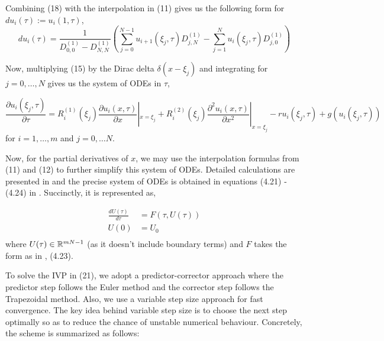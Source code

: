 \documentclass[a4paper,12pt]{article}
\begin{document}
Combining (18) with the interpolation in (11) gives us the following form for $du_i(\tau) := u_i(1, \tau)$,
\begin{equation}
    du_i(\tau) = \frac{1}{D_{0,0}^{(1)} - D_{N,N}^{(1)}} \left( \sum_{j=0}^{N-1} u_{i+1}(\xi_j, \tau)D_{j,N}^{(1)} - \sum_{j=1}^{N} u_{i}(\xi_j, \tau)D_{j,0}^{(1)} \right)
\end{equation}

Now, multiplying (15) by the Dirac delta $\delta(x - \xi_j)$ and integrating for $j = 0, \dots, N$ gives us the system of ODEs in $\tau$,

\begin{equation}
    \frac{\partial u_i(\xi_j, \tau)}{\partial \tau} = R_i^{(1)}(\xi_j)\frac{\partial u_i(x, \tau)}{\partial x}|_{x = \xi_j} + R_i^{(2)}(\xi_j)\frac{\partial^2 u_i(x, \tau)}{\partial x^2}|_{x = \xi_j} - ru_i(\xi_j, \tau) + g(u_i(\xi_j,\tau))
\end{equation}
for $i = 1, \dots, m$ and $j = 0, \dots N$.

Now, for the partial derivatives of $x$, we may use the interpolation formulas from (11) and (12) to further simplify this system of ODEs. Detailed calculations are presented in \cite{col} and the precise system of ODEs is obtained in equations (4.21) - (4.24) in \cite{col}. Succinctly, it is represented as,

\begin{equation}
    \begin{split}
        \frac{dU(\tau)}{d\tau} &= F(\tau, U(\tau))\\
        U(0) &= U_0\\
    \end{split}
\end{equation}
where $U(\tau) \in \mathbb{R}^{mN - 1}$ (as it doesn't include boundary terms) and $F$ takes the form as in \cite{col}, (4.23).

To solve the IVP in (21), we adopt a predictor-corrector approach where the predictor step follows the Euler method and the corrector step follows the Trapezoidal method. Also, we use a variable step size approach for fast convergence. The key idea behind variable step size is to choose the next step optimally so as to reduce the chance of unstable numerical behaviour. Concretely, the scheme is summarized as follows:
\end{document}
